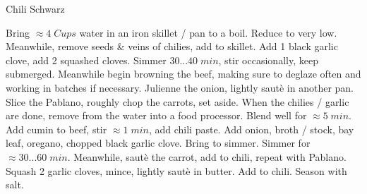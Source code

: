 \begin{recipe}[
	preparationtime = 1 hour,
	bakingtime = 1 hour,
	portion = 4 people,
	]
	{Chili Schwarz}

	
	\preparation
	{
		\step Bring $\approx 4\;Cups$ water in an iron skillet / pan to a boil. Reduce to very low.
		\step Meanwhile, remove seeds \& veins of chilies, add to skillet. Add 1 black garlic clove, add 2 squashed cloves. Simmer $30...40\; min$, stir occasionally, keep submerged.
		\step Meanwhile begin browning the beef, making sure to deglaze often and working in batches if necessary.
		\step Julienne the onion, lightly saut\`{e} in another pan. Slice the Pablano, roughly chop the carrots, set aside.
		\step When the chilies / garlic are done, remove from the water into a food processor. Blend well for $\approx5\;min$.
		\step Add cumin to beef, stir $\approx 1\;min$, add chili paste.
		\step Add onion, broth / stock, bay leaf, oregano, chopped black garlic clove. Bring to simmer. Simmer for $\approx30...60\;min$.
		\step Meanwhile, saut\`{e} the carrot, add to chili, repeat with Pablano.
		\step Squash 2 garlic cloves, mince, lightly saut\`{e} in butter. Add to chili. Season with salt.
	}
	

\end{recipe}
